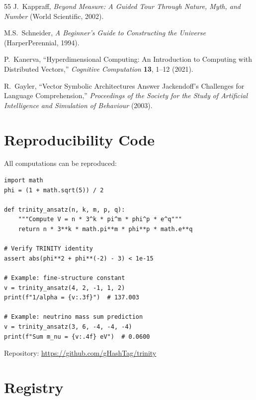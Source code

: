\documentclass[aps,prd,preprint,superscriptaddress,showpacs,nofootinbib,longbibliography]{revtex4-2}
\begin{document}
\begin{thebibliography}{55}
J.~Kappraff,
\textit{Beyond Measure: A Guided Tour Through Nature, Myth, and Number} (World Scientific, 2002).

M.S.~Schneider,
\textit{A Beginner's Guide to Constructing the Universe} (HarperPerennial, 1994).


P.~Kanerva,
``Hyperdimensional Computing: An Introduction to Computing with Distributed Vectors,''
\textit{Cognitive Computation} \textbf{13}, 1--12 (2021).

R.~Gayler,
``Vector Symbolic Architectures Answer Jackendoff's Challenges for Language Comprehension,''
\textit{Proceedings of the Society for the Study of Artificial Intelligence and Simulation of Behaviour} (2003).

\end{thebibliography}

\appendix

\section{Reproducibility Code}
\label{app:reproduce}

All computations can be reproduced:

\begin{verbatim}
import math
phi = (1 + math.sqrt(5)) / 2

def trinity_ansatz(n, k, m, p, q):
    """Compute V = n * 3^k * pi^m * phi^p * e^q"""
    return n * 3**k * math.pi**m * phi**p * math.e**q

# Verify TRINITY identity
assert abs(phi**2 + phi**(-2) - 3) < 1e-15

# Example: fine-structure constant
v = trinity_ansatz(4, 2, -1, 1, 2)
print(f"1/alpha = {v:.3f}")  # 137.003

# Example: neutrino mass sum prediction
v = trinity_ansatz(3, 6, -4, -4, -4)
print(f"Sum m_nu = {v:.4f} eV")  # 0.0600
\end{verbatim}

Repository: \url{https://github.com/gHashTag/trinity}

\section{Registry}
\end{document}

